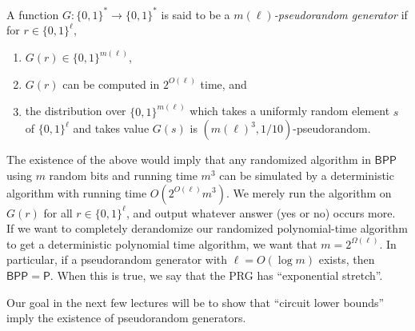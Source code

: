 		\begin{fdef}
			A function $G : \{0,1\}^* \to \{0,1\}^*$ is said to be a \emph{$m(\ell)$-pseudorandom generator} if for $r \in \{0,1\}^\ell$,
			\begin{enumerate}[label=(\alph*)]
				\item $G(r) \in \{0,1\}^{m(\ell)}$,
				\item $G(r)$ can be computed in $2^{O(\ell)}$ time, and
				\item the distribution over $\{0,1\}^{m(\ell)}$ which takes a uniformly random element $s$ of $\{0,1\}^\ell$ and takes value $G(s)$ is $(m(\ell)^3 , 1/10)$-pseudorandom.
			\end{enumerate}
		\end{fdef}
		The existence of the above would imply that any randomized algorithm in $\mathsf{BPP}$ using $m$  random bits and running time $m^3$ can be simulated by a deterministic algorithm with running time $O(2^{O(\ell)}m^3)$. We merely run the algorithm on $G(r)$ for all $r \in \{0,1\}^\ell$, and output whatever answer (\textsf{yes} or \textsf{no}) occurs more. \\
		If we want to completely derandomize our randomized polynomial-time algorithm to get a deterministic polynomial time algorithm, we want that $m = 2^{\Omega(\ell)}$. In particular, if a pseudorandom generator with $\ell = O(\log m)$ exists, then $\mathsf{BPP} = \mathsf{P}$. When this is true, we say that the PRG has ``exponential stretch''. %

		Our goal in the next few lectures will be to show that ``circuit lower bounds'' imply the existence of pseudorandom generators.

